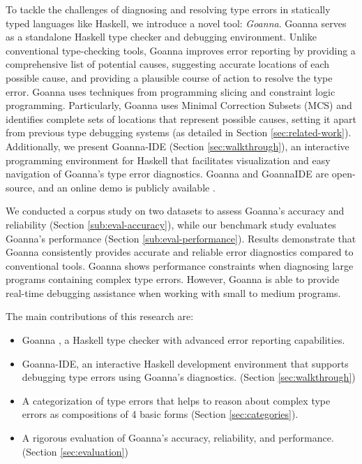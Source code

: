 \documentclass[pdflatex,lineno,sn-nature,Numbered]{sn-jnl}%
\begin{document}
To tackle the challenges of diagnosing and resolving type errors in statically typed languages like Haskell, we introduce a novel tool: \textit{Goanna}. Goanna serves as a standalone Haskell type checker and debugging environment. Unlike conventional type-checking tools, Goanna improves error reporting by providing a comprehensive list of potential causes, suggesting accurate locations of each possible cause, and providing a plausible course of action to resolve the type error. Goanna uses techniques from programming slicing and constraint logic programming. Particularly, Goanna uses Minimal Correction Subsets (MCS) and identifies complete sets of locations that represent possible causes, setting it apart from previous type debugging systems (as detailed in Section \ref{sec:related-work}). Additionally, we present Goanna-IDE (Section \ref{sec:walkthrough}), an interactive programming environment for Haskell that facilitates visualization and easy navigation of Goanna's type error diagnostics. Goanna and GoannaIDE are open-source, and an online demo is publicly available \cite{Fu2025-le}.

We conducted a corpus study on two datasets to assess Goanna's accuracy and reliability (Section \ref{sub:eval-accuracy}), while our benchmark study evaluates Goanna's performance (Section \ref{sub:eval-performance}). Results demonstrate that Goanna consistently provides accurate and reliable error diagnostics compared to conventional tools. Goanna shows performance constraints when diagnosing large programs containing complex type errors. However, Goanna is able to provide real-time debugging assistance when working with small to medium programs.

The main contributions of this research are:
\begin{itemize}
    \item Goanna \cite{Fu2025-le}, a Haskell type checker with advanced error reporting capabilities.
    \item Goanna-IDE, an interactive Haskell development environment that supports debugging type errors using Goanna's diagnostics. (Section \ref{sec:walkthrough})
    \item A categorization of type errors that helps to reason about complex type errors as compositions of 4 basic forms (Section \ref{sec:categories}).
    \item A rigorous evaluation of Goanna's accuracy, reliability, and performance. (Section \ref{sec:evaluation})
\end{itemize}
\end{document}
